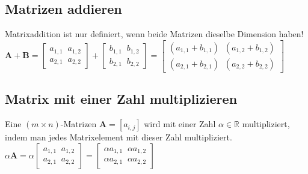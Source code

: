 \documentclass[../main.tex]{subfiles}
\begin{document}
\subsection{Matrizen addieren}
Matrixaddition ist nur definiert, wenn beide Matrizen dieselbe Dimension haben! \\ [7pt]

$\mathbf{A} + \mathbf{B}= 
\begin{bmatrix}
    a_{1,1} \;\; a_{1,2}\\
    a_{2,1} \;\; a_{2,2} 
\end{bmatrix} +  
\begin{bmatrix}
    b_{1,1} \;\; b_{1,2}\\
    b_{2,1} \;\; b_{2,2} 
\end{bmatrix} =
\begin{bmatrix}
    (a_{1,1}+b_{1,1}) \;\; (a_{1,2}+b_{1,2})\\
    (a_{2,1}+b_{2,1}) \;\; (a_{2,2}+b_{2,2}) 
\end{bmatrix}
$

\subsection{Matrix mit einer Zahl multiplizieren}
Eine $(m\times n)$-Matrizen $\mathbf{A}=[a_{i,j}]$ wird mit einer Zahl $\alpha\in\mathbb{R}$
multipliziert, indem man jedes Matrixelement mit dieser Zahl multipliziert. \\ [7pt]

$\alpha\mathbf{A}=\alpha
\begin{bmatrix}
    a_{1,1} \;\; a_{1,2}\\
    a_{2,1} \;\; a_{2,2} 
\end{bmatrix} =
\begin{bmatrix}
    \alpha a_{1,1} \;\; \alpha a_{1,2}\\
    \alpha a_{2,1} \;\; \alpha a_{2,2} 
\end{bmatrix}$
\end{document}
